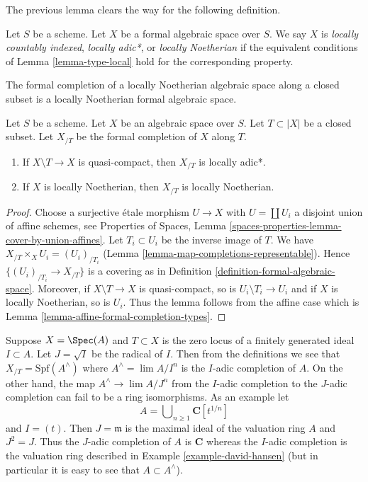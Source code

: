 \noindent
The previous lemma clears the way for the following definition.

\begin{definition}
\label{definition-types-formal-algebraic-spaces}
Let $S$ be a scheme. Let $X$ be a formal algebraic space over $S$.
We say $X$ is {\it locally countably indexed},
{\it locally adic*}, or {\it locally Noetherian}
if the equivalent conditions of Lemma \ref{lemma-type-local}
hold for the corresponding property.
\end{definition}

\noindent
The formal completion of a locally Noetherian algebraic space
along a closed subset is a locally Noetherian formal algebraic space.

\begin{lemma}
\label{lemma-formal-completion-types}
Let $S$ be a scheme. Let $X$ be an algebraic space over $S$.
Let $T \subset |X|$ be a closed subset. Let $X_{/T}$ be the
formal completion of $X$ along $T$.
\begin{enumerate}
\item If $X \setminus T \to X$ is quasi-compact,
then $X_{/T}$ is locally adic*.
\item If $X$ is locally Noetherian, then $X_{/T}$ is locally
Noetherian.
\end{enumerate}
\end{lemma}

\begin{proof}
Choose a surjective \'etale morphism $U \to X$ with $U = \coprod U_i$
a disjoint union of affine schemes, see Properties of Spaces, Lemma
\ref{spaces-properties-lemma-cover-by-union-affines}.
Let $T_i \subset U_i$ be the inverse image of $T$.
We have $X_{/T} \times_X U_i = (U_i)_{/T_i}$
(Lemma \ref{lemma-map-completions-representable}).
Hence $\{(U_i)_{/T_i} \to X_{/T}\}$ is a covering as in
Definition \ref{definition-formal-algebraic-space}.
Moreover, if $X \setminus T \to X$ is quasi-compact, so is
$U_i \setminus T_i \to U_i$ and if $X$ is locally Noetherian, so is
$U_i$. Thus the lemma follows from the affine case which is
Lemma \ref{lemma-affine-formal-completion-types}.
\end{proof}

\begin{remark}[Warning]
\label{remark-warning-completion}
Suppose $X = \Spec(A)$ and $T \subset X$ is the zero locus of a
finitely generated ideal $I \subset A$. Let $J = \sqrt{I}$ be
the radical of $I$. Then from the definitions we see that
$X_{/T} = \text{Spf}(A^\wedge)$ where $A^\wedge = \lim A/I^n$ is
the $I$-adic completion of $A$. On the other hand, the map
$A^\wedge \to \lim A/J^n$ from the $I$-adic completion to
the $J$-adic completion can fail to be a ring isomorphisms.
As an example let
$$
A = \bigcup\nolimits_{n \geq 1} \mathbf{C}[t^{1/n}]
$$
and $I = (t)$. Then $J = \mathfrak m$ is the maximal ideal
of the valuation ring $A$ and $J^2 = J$. Thus the $J$-adic completion
of $A$ is $\mathbf{C}$ whereas the $I$-adic completion
is the valuation ring described in Example \ref{example-david-hansen}
(but in particular it is easy to see that $A \subset A^\wedge$).
\end{remark}

